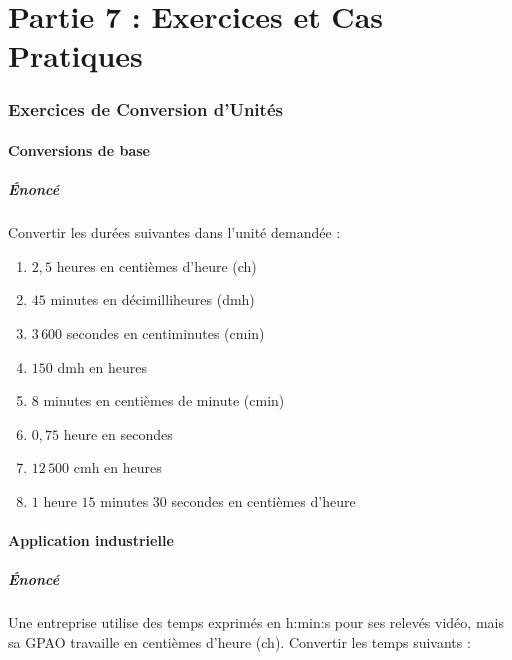 \documentclass[a4paper,12pt]{article}
\begin{document}
\part*{Partie 7 : Exercices et Cas Pratiques}

\section{Exercices de Conversion d'Unités}

\subsection{Conversions de base}

\subsubsection*{Énoncé}

Convertir les durées suivantes dans l'unité demandée :

\begin{enumerate}
    \item $2,5$ heures en centièmes d'heure (ch)
    \item $45$ minutes en décimilliheures (dmh)
    \item $3\,600$ secondes en centiminutes (cmin)
    \item $150$ dmh en heures
    \item $8$ minutes en centièmes de minute (cmin)
    \item $0,75$ heure en secondes
    \item $12\,500$ cmh en heures
    \item $1$ heure $15$ minutes $30$ secondes en centièmes d'heure
\end{enumerate}

\subsection{Application industrielle}

\subsubsection*{Énoncé}

Une entreprise utilise des temps exprimés en h:min:s pour ses relevés vidéo, mais sa GPAO travaille en centièmes d'heure (ch). Convertir les temps suivants :
\end{document}

